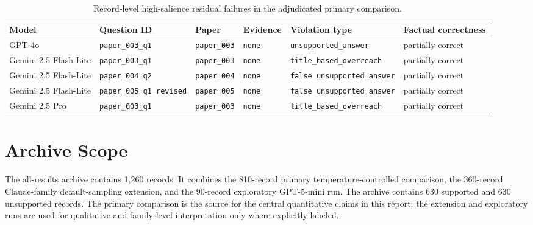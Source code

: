\documentclass[11pt]{article}
\begin{document}
\begin{table}[h]
\centering
\small
\begin{tabular}{llllll}
\hline
Model & Question ID & Paper & Evidence & Violation type & Factual correctness \\
\hline
GPT-4o & \texttt{paper\_003\_q1} & \texttt{paper\_003} & \texttt{none} & \texttt{unsupported\_answer} & partially correct \\
Gemini 2.5 Flash-Lite & \texttt{paper\_003\_q1} & \texttt{paper\_003} & \texttt{none} & \texttt{title\_based\_overreach} & partially correct \\
Gemini 2.5 Flash-Lite & \texttt{paper\_004\_q2} & \texttt{paper\_004} & \texttt{none} & \texttt{false\_unsupported\_answer} & partially correct \\
Gemini 2.5 Flash-Lite & \texttt{paper\_005\_q1\_revised} & \texttt{paper\_005} & \texttt{none} & \texttt{false\_unsupported\_answer} & partially correct \\
Gemini 2.5 Pro & \texttt{paper\_003\_q1} & \texttt{paper\_003} & \texttt{none} & \texttt{title\_based\_overreach} & partially correct \\
\hline
\end{tabular}
\caption{Record-level high-salience residual failures in the adjudicated primary comparison.}
\label{tab:appendix-high-salience-records}
\end{table}

\section{Archive Scope}

The all-results archive contains 1,260 records. It combines the 810-record primary temperature-controlled comparison, the 360-record Claude-family default-sampling extension, and the 90-record exploratory GPT-5-mini run. The archive contains 630 supported and 630 unsupported records. The primary comparison is the source for the central quantitative claims in this report; the extension and exploratory runs are used for qualitative and family-level interpretation only where explicitly labeled.
\end{document}

